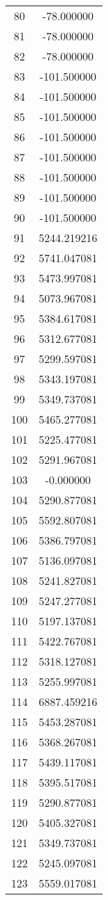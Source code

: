 \documentclass[12pt]{article}
\begin{document}
\begin{longtable}{@{}cc@{}}
80 & -78.000000 \\
81 & -78.000000 \\
82 & -78.000000 \\
83 & -101.500000 \\
84 & -101.500000 \\
85 & -101.500000 \\
86 & -101.500000 \\
87 & -101.500000 \\
88 & -101.500000 \\
89 & -101.500000 \\
90 & -101.500000 \\
91 & 5244.219216 \\
92 & 5741.047081 \\
93 & 5473.997081 \\
94 & 5073.967081 \\
95 & 5384.617081 \\
96 & 5312.677081 \\
97 & 5299.597081 \\
98 & 5343.197081 \\
99 & 5349.737081 \\
100 & 5465.277081 \\
101 & 5225.477081 \\
102 & 5291.967081 \\
103 & -0.000000 \\
104 & 5290.877081 \\
105 & 5592.807081 \\
106 & 5386.797081 \\
107 & 5136.097081 \\
108 & 5241.827081 \\
109 & 5247.277081 \\
110 & 5197.137081 \\
111 & 5422.767081 \\
112 & 5318.127081 \\
113 & 5255.997081 \\
114 & 6887.459216 \\
115 & 5453.287081 \\
116 & 5368.267081 \\
117 & 5439.117081 \\
118 & 5395.517081 \\
119 & 5290.877081 \\
120 & 5405.327081 \\
121 & 5349.737081 \\
122 & 5245.097081 \\
123 & 5559.017081 \\

\end{longtable}
\end{document}
